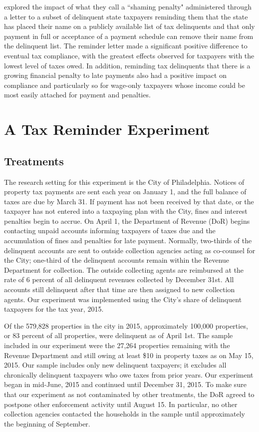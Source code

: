 \documentclass[12pt]{article}
\begin{document}
 explored the impact of what they call
a ``shaming penalty" administered through a letter to a subset of
delinquent state taxpayers reminding them that the state has placed
their name on a publicly available list of tax delinquents and that
only payment in full or acceptance of a payment schedule can remove
their name from the delinquent list.  The reminder letter made a
significant positive difference to eventual tax compliance, with the
greatest effects observed for taxpayers with the lowest level of taxes
owed.  In addition, reminding tax delinquents that there is a growing
financial penalty to late payments also had a positive impact on
compliance and particularly so for wage-only taxpayers whose income
could be most easily attached for payment and penalties.

  
\section{ A Tax Reminder Experiment}
  
\subsection{Treatments}

The research setting for this experiment is the City of Philadelphia.
Notices of property tax payments are sent each year on January 1, and
the full balance of taxes are due by March 31.  If payment has not
been received by that date, or the taxpayer has not entered into a
taxpaying plan with the City, fines and interest penalties begin to
accrue.  On April 1, the Department of Revenue (DoR) begins contacting
unpaid accounts informing taxpayers of taxes due and the accumulation
of fines and penalties for late payment.  Normally, two-thirds of the
delinquent accounts are sent to outside collection agencies acting as
co-counsel for the City; one-third of the delinquent accounts remain
within the Revenue Department for collection.  The outside collecting
agents are reimbursed at the rate of 6 percent of all delinquent
revenues collected by December 31st.  All accounts still delinquent
after that time are then assigned to new collection agents.  Our
experiment was implemented using the City's share of delinquent
taxpayers for the tax year, 2015.
  
Of the 579,828 properties in the city in 2015, approximately 100,000
properties, or 83 percent of all properties, were delinquent as of
April 1st.  The sample included in our experiment were the 27,264
properties remaining with the Revenue Department and still owing at
least \$10 in property taxes as on May 15, 2015.  Our sample includes
only new delinquent taxpayers; it excludes all chronically delinquent
taxpayers who owe taxes from prior years.  Our experiment began in
mid-June, 2015 and continued until December 31, 2015.  To make sure
that our experiment as not contaminated by other treatments, the DoR
agreed to postpone other enforcement activity until August 15. In
particular, no other collection agencies contacted the households in
the sample until approximately the beginning of September.
\end{document}
